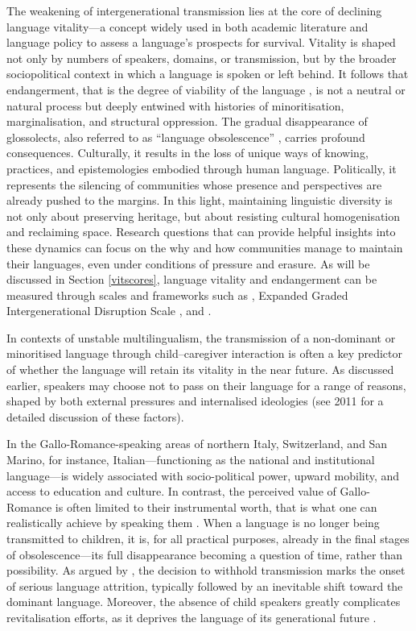 \documentclass[a4paper,11pt]{article}
\begin{document}
The weakening of intergenerational transmission lies at the core of declining language vitality—a concept widely used in both academic literature and language policy to assess a language's prospects for survival. Vitality is shaped not only by numbers of speakers, domains, or transmission, but by the broader sociopolitical context in which a language is spoken or left behind. It follows that endangerment, that is the degree of viability of the language \citep[9]{tsunoda2006language}, is not a neutral or natural process but deeply entwined with histories of minoritisation, marginalisation, and structural oppression. The gradual disappearance of glossolects, also referred to as ``language obsolescence'' \citep{dorian1992investigating}, carries profound consequences. Culturally, it results in the loss of unique ways of knowing, practices, and epistemologies embodied through human language. Politically, it represents the silencing of communities whose presence and perspectives are already pushed to the margins. In this light, maintaining linguistic diversity is not only about preserving heritage, but about resisting cultural homogenisation and reclaiming space. Research questions that can provide helpful insights into these dynamics can focus on the why and how communities manage to maintain their languages, even under conditions of pressure and erasure. As will be discussed in Section \ref{vitscores}, language vitality and endangerment can be measured through scales and frameworks such as \citet{unesco2003}, Expanded Graded Intergenerational Disruption Scale \citep{lewis2010}, and \citet{fishman1991reversing}.

In contexts of unstable multilingualism, the transmission of a non-dominant or minoritised language through child–caregiver interaction is often a key predictor of whether the language will retain its vitality in the near future. As discussed earlier, speakers may choose not to pass on their language for a range of reasons, shaped by both external pressures and internalised ideologies (see \citeauthor{austin2011cambridge} 2011 for a detailed discussion of these factors).

In the Gallo-Romance-speaking areas of northern Italy, Switzerland, and San Marino, for instance, Italian—functioning as the national and institutional language—is widely associated with socio-political power, upward mobility, and access to education and culture. In contrast, the perceived value of Gallo-Romance is often limited to their instrumental worth, that is what one can realistically achieve by speaking them \citep{grenoble2006saving}. When a language is no longer being transmitted to children, it is, for all practical purposes, already in the final stages of obsolescence—its full disappearance becoming a question of time, rather than possibility. As argued by \citet{winford2003introduction}, the decision to withhold transmission marks the onset of serious language attrition, typically followed by an inevitable shift toward the dominant language. Moreover, the absence of child speakers greatly complicates revitalisation efforts, as it deprives the language of its generational future \citep{grenoble2006saving}.
\end{document}
